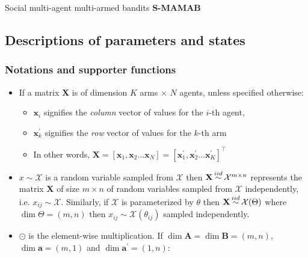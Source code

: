\documentclass[fleqn]{article}
\newcommand\iidsim{\stackrel{\mathclap{iid}}{\sim}}
\begin{document}
\begin{algorithm}[!ht]
{    }


\caption{Social multi-agent multi-armed bandits \textbf{S-MAMAB}}

\end{algorithm}

\subsection*{Descriptions of parameters and states}

\subsubsection*{Notations and supporter functions}

\begin{itemize}
    \item If a matrix $\mathbf{X}$ is of dimension $K$ arms $\times$ $N$ agents, unless specified otherwise:
        \begin{itemize}
            \item $\mathbf{x}_i$ signifies the \textit{column} vector of values for the $i$-th agent,
            \item $\mathbf{x}^{\prime}_k$ signifies the \textit{row} vector of values for the $k$-th arm
            \item In other words,
            $
            \mathbf{X} =
            \left[
                \mathbf{x}_1,
                \mathbf{x}_2
                \dots
                \mathbf{x}_N
            \right] =
            \left[
                \mathbf{x}^{\prime}_1,
                \mathbf{x}^{\prime}_2
                \dots
                \mathbf{x}^{\prime}_K
            \right]^{\top}
            $
        \end{itemize}
    \item $x \sim \mathcal{X}$ is a random variable sampled from $\mathcal{X}$
        then $\mathbf{X} \iidsim \mathcal{X}^{m \times n}$
        represents the matrix $\mathbf{X}$ of size $m \times n$
        of random variables sampled from $\mathcal{X}$ independently,
        i.e. $x_{ij} \sim \mathcal{X}$.
        Similarly, if $\mathcal{X}$ is parameterized by $\theta$ then
        $\mathbf{X} \iidsim \mathcal{X}(\Theta)$ where $\dim \Theta = (m,n)$ then
        $x_{ij} \sim \mathcal{X}(\theta_{ij})$ sampled independently.
    \item $\odot$ is the element-wise multiplication.
        If $\dim\mathbf{A} = \dim\mathbf{B} = (m,n)$,
        $\dim\mathbf{a} = (m,1)$ and
        $\dim\mathbf{a}^{\prime} = (1,n)$:

\end{itemize}
\end{document}
